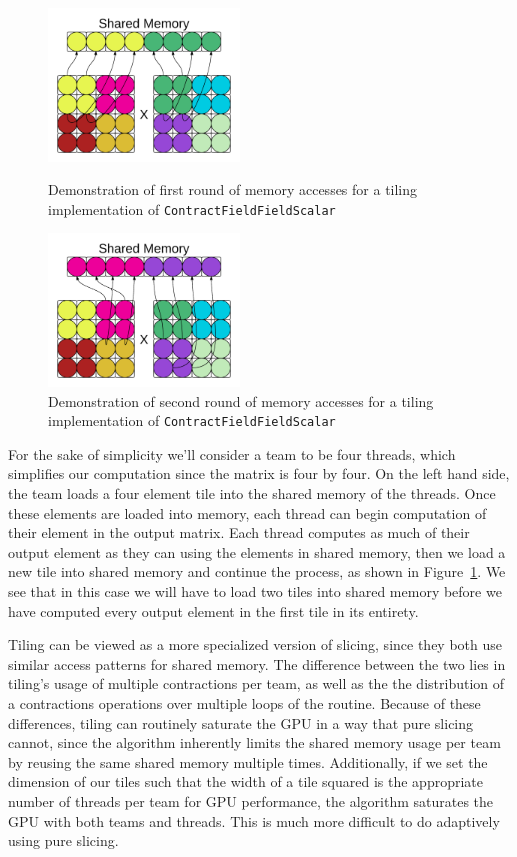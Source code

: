 \begin{figure}[!ht]
    \centering
    \includegraphics[width=2in]{SharedMem1.png}
    \caption[Memory accesses -- tiling]{Demonstration of first round of memory
        accesses for a tiling implementation of \texttt{ContractFieldFieldScalar}}
    
    \includegraphics[width=2in]{SharedMem2.png} \caption[Memory accesses --
    tiling]{Demonstration of second round of memory accesses for a tiling
        implementation of \texttt{ContractFieldFieldScalar}}
\label{fig:Tiling}
\end{figure}

For the sake of simplicity we'll consider a team to be four threads, which
simplifies our computation since the matrix is four by four. On the left hand
side, the team loads a four element tile into the shared memory of the
threads. Once these elements are loaded into memory, each thread can begin
computation of their element in the output matrix. Each thread computes as much
of their output element as they can using the elements in shared memory, then
we load a new tile into shared memory and continue the process, as shown in Figure~\ref{fig:Tiling}.
We see that in this case we will have to load two tiles into shared memory
before we have computed every output element in the first tile in its entirety. 


    Tiling can be viewed as a more specialized version of slicing, since they
both use similar access patterns for shared memory. The difference between the
two lies in tiling's usage of multiple contractions per team, as well as the
the distribution of a contractions operations over multiple loops of the
routine. Because of these differences, tiling can routinely saturate the GPU in
a way that pure slicing cannot, since the algorithm inherently limits the
shared memory usage per team by reusing the same shared memory multiple times.
Additionally, if we set the dimension of our tiles such that the width of a tile
squared is the appropriate number of threads per team for GPU performance, the algorithm
saturates the GPU with both teams and threads. This is much more difficult to do 
adaptively using pure slicing. 
	

